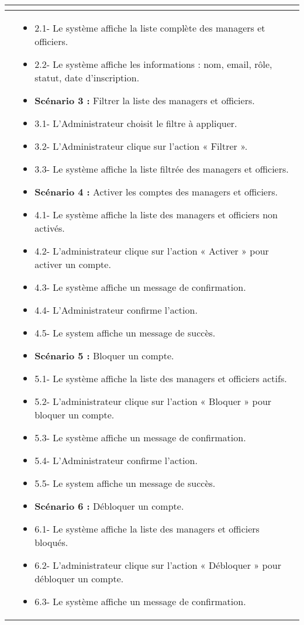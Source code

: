 \begin{longtable}{|>{\arraybackslash}p{4.2cm}|>{\arraybackslash}p{12.5cm}|}
\begin{itemize}[label=]
\end{itemize} \\
\hline
\textbf{}&
\begin{itemize}[label=]
\item 2.1- Le système affiche la liste complète des managers et officiers.
   \item 2.2- Le système affiche les informations : nom, email, rôle, statut, date d'inscription.

  \item \textbf{Scénario 3 :} Filtrer la liste des managers et officiers.
  \item 3.1- L'Administrateur choisit le filtre à appliquer.
  \item 3.2- L'Administrateur clique sur l'action « Filtrer ».
  \item 3.3- Le système affiche la liste filtrée des managers et officiers.

  \item \textbf{Scénario 4 :} Activer les comptes des managers et officiers.
  \item 4.1- Le système affiche la liste des managers et officiers non activés.
  \item 4.2- L'administrateur clique sur l'action « Activer » pour activer un compte.
  \item 4.3- Le système affiche un message de confirmation.
  \item 4.4- L'Administrateur confirme l'action.
  \item 4.5- Le system affiche un message de succès.

  \item \textbf{Scénario 5 :} Bloquer un compte.
  \item 5.1- Le système affiche la liste des managers et officiers actifs.
  \item 5.2- L'administrateur clique sur l'action « Bloquer » pour bloquer un compte.
  \item 5.3- Le système affiche un message de confirmation.
  \item 5.4- L'Administrateur confirme l'action.
  \item 5.5- Le system affiche un message de succès.

  \item \textbf{Scénario 6 :} Débloquer un compte.
  \item 6.1- Le système affiche la liste des managers et officiers bloqués.
  \item 6.2- L'administrateur clique sur l'action « Débloquer » pour débloquer un compte.
  \item 6.3- Le système affiche un message de confirmation.


\end{itemize}
\end{longtable}
